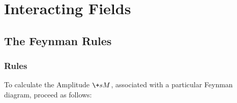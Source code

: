 \documentclass[hidelinks]{article}
\begin{document}
\section{Interacting Fields} %
\label{sec:interacting_fields_and_feynman_diagrams}

\subsection{The Feynman Rules} %
\label{sub:the_feynman_rules}

\subsubsection{Rules} %
\label{ssub:rules}

To calculate the Amplitude $\+sM$, associated with a particular Feynman diagram, proceed as follows:
\end{document}
